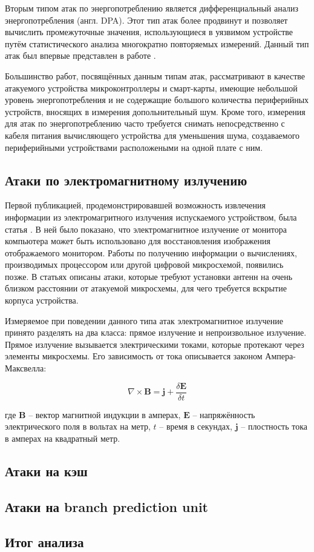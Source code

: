 Вторым типом атак по энергопотреблению является дифференциальный анализ
энергопотребления (англ. DPA). Этот тип атак более продвинут и позволяет
вычислить промежуточные значения, использующиеся в уязвимом устройстве путём
статистического анализа многократно повторяемых измерений. Данный тип атак был
впервые представлен в работе \cite{kocher-dpa}.

Большинство работ, посвящённых данным типам атак, рассматривают в качестве
атакуемого устройства микроконтроллеры и смарт-карты, имеющие небольшой уровень
энергопотребления и не содержащие большого количества периферийных устройств,
вносящих в измерения допольнительный шум. Кроме того, измерения для атак по
энергопотреблению часто требуется снимать непосредственно с кабеля питания
вычисляющего устройства для уменьшения шума, создаваемого периферийными
устройствами расположеными на одной плате с ним.

\subsection{Атаки по электромагнитному излучению}

Первой публикацией, продемонстрировавшей возможность извлечения информации
из электромагритного излучения испускаемого устройством, была статья
\cite{van-eck}. В ней было показано, что электромагнитное излучение от монитора
компьютера может быть использовано для восстановления изображения отображаемого монитором.
Работы по получению информации о вычислениях, производимых процессором или
другой цифровой микросхемой, появились позже. В статьях \cite{ema1} \cite{ema2}
описаны атаки, которые требуют установки антенн на очень близком расстоянии от
атакуемой микросхемы, для чего требуется вскрытие корпуса устройства.

Измеряемое при поведении данного типа атак электромагнитное излучение принято разделять
на два класса: прямое излучение и непроизвольное излучение. Прямое излучение вызывается
электрическими токами, которые протекают через элементы микросхемы. Его зависимость
от тока описывается законом Ампера-Максвелла:

\begin{equation}
\nabla \times \mathbf{B} = \mathbf{j} + \frac{\delta \mathbf{E}}{\delta t}
\end{equation}

где $\mathbf{B}$ -- вектор магнитной индукции в амперах, $\mathbf{E}$ --
напряжённость электрического поля в вольтах на метр, $t$ -- время в секундах,
$\mathbf{j}$ -- плостность тока в амперах на квадратный метр.


\subsection{Атаки на кэш}
\clearpage

\subsection{Атаки на branch prediction unit}
\clearpage

\subsection{Итог анализа}
\clearpage
